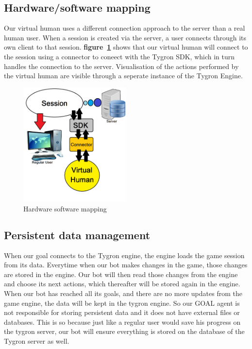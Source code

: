 \subsection{Hardware/software mapping}
Our virtual human uses a different connection approach to the server than a real human user. When a session is created via the server, a user connects through its own client to that session. \textbf{figure~\ref{fig:Hard_soft_map}} shows that our virtual human will connect to the session using a connector to coneect with the Tygron SDK, which in turn handles the connection to the server. Visualisation of the actions performed by the virtual human are visible through a seperate instance of the Tygron Engine.

\begin{figure}
	\centering
	\includegraphics[width=0.5\textwidth]{Hardware_software_mapping}
	\caption{Hardware software mapping}
	\label{fig:Hard_soft_map}
\end{figure}

\subsection{Persistent data management}
When our goal connects to the Tygron engine, the engine loads the game session from its data. Everytime when our bot makes changes in the game, those changes are stored in the engine. Our bot will then read those changes from the engine and choose its next actions, which thereafter will be stored again in the engine. When our bot has reached all its goals, and there are no more updates from the game engine, the data will be kept in the tygron engine. So our GOAL agent is not responsible for storing persistent data and it does not have external files or databases. This is so because just like a regular user would save his progress on the tygron server, our bot will ensure everything is stored on the database of the Tygron server as well.

